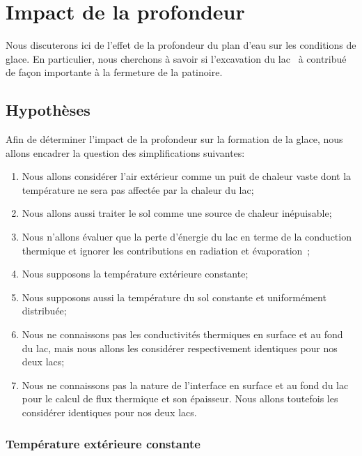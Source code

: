 \documentclass[12pt]{article}
\numberwithin{figure}{section}
\numberwithin{table}{section}
\begin{document}
\section{Impact de la profondeur}

Nous discuterons ici de l'effet de la profondeur du plan d'eau sur les conditions de glace. En
particulier, nous cherchons \`a savoir si l'excavation du lac~\cite{Lac} \`a contribu\'e de fa\c con
importante \`a la fermeture de la patinoire.

\subsection{Hypoth\`eses}

Afin de d\'eterminer l'impact de la profondeur sur la formation de la glace, nous allons encadrer la
question des simplifications suivantes:

\begin{enumerate}
    \item Nous allons consid\'erer l'air ext\'erieur comme un puit de chaleur vaste dont la
        temp\'erature ne sera pas affect\'ee par la chaleur du lac;
    \item Nous allons aussi traiter le sol comme une source de chaleur in\'epuisable;
    \item Nous n'allons \'evaluer que la perte d'\'energie du lac en terme de la conduction thermique
        et ignorer les contributions en radiation et \'evaporation~\cite{Evap};
    \item Nous supposons la temp\'erature ext\'erieure constante;
    \item Nous supposons aussi la temp\'erature du sol constante et uniform\'ement distribu\'ee;
    \item Nous ne connaissons pas les conductivit\'es thermiques en surface et au fond du lac, mais
        nous allons les consid\'erer respectivement identiques pour nos deux lacs;
    \item Nous ne connaissons pas la nature de l'interface en surface et au fond du lac pour le
        calcul de flux thermique et son \'epaisseur. Nous allons toutefois les consid\'erer
        identiques pour nos deux lacs.
\end{enumerate}

\subsubsection{Temp\'erature ext\'erieure constante}
\end{document}
